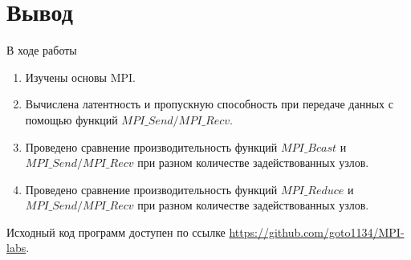 	\section{Вывод}
		В ходе работы
		\begin{enumerate}
			\item Изучены основы MPI.
			\item Вычислена латентность и пропускную способность при передаче данных с помощью функций $ MPI\_Send/MPI\_Recv $.
			\item Проведено сравнение производительность функций $ MPI\_Bcast $ и $ MPI\_Send/MPI\_Recv $ при разном количестве задействованных узлов.
			\item Проведено сравнение производительность функций $ MPI\_Reduce $ и $ MPI\_Send / MPI\_Recv $ при разном количестве задействованных узлов.
		\end{enumerate}
	
		Исходный код программ доступен по ссылке \href{https://github.com/goto1134/MPI-labs}{https://github.com/goto1134/MPI-labs}.